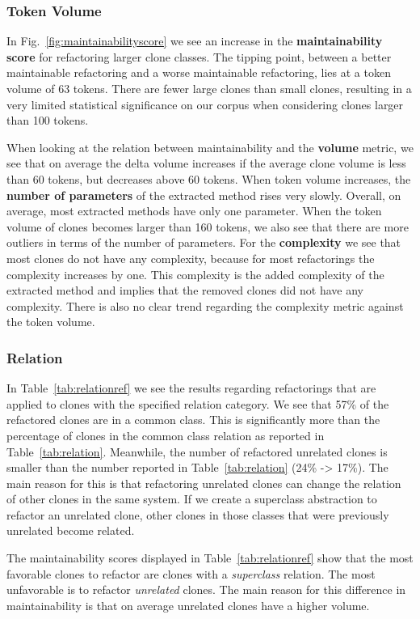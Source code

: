 \subsubsection{Token Volume}
In Fig.~\ref{fig:maintainabilityscore} we see an increase in the \textbf{maintainability score} for refactoring larger clone classes. The tipping point, between a better maintainable refactoring and a worse maintainable refactoring, lies at a token volume of 63 tokens. There are fewer large clones than small clones, resulting in a very limited statistical significance on our corpus when considering clones larger than 100 tokens.

When looking at the relation between maintainability and the \textbf{volume} metric, we see that on average the delta volume increases if the average clone volume is less than 60 tokens, but decreases above 60 tokens. When token volume increases, the \textbf{number of parameters} of the extracted method rises very slowly. Overall, on average, most extracted methods have only one parameter. When the token volume of clones becomes larger than 160 tokens, we also see that there are more outliers in terms of the number of parameters. For the \textbf{complexity} we see that most clones do not have any complexity, because for most refactorings the complexity increases by one. This complexity is the added complexity of the extracted method and implies that the removed clones did not have any complexity. There is also no clear trend regarding the complexity metric against the token volume.

\subsubsection{Relation}
In Table~\ref{tab:relationref} we see the results regarding refactorings that are applied to clones with the specified relation category. We see that 57\% of the refactored clones are in a common class. This is significantly more than the percentage of clones in the common class relation as reported in Table~\ref{tab:relation}. Meanwhile, the number of refactored unrelated clones is smaller than the number reported in Table~\ref{tab:relation} (24\% -> 17\%). The main reason for this is that refactoring unrelated clones can change the relation of other clones in the same system. If we create a superclass abstraction to refactor an unrelated clone, other clones in those classes that were previously unrelated become related.

The maintainability scores displayed in Table~\ref{tab:relationref} show that the most favorable clones to refactor are clones with a \textit{superclass} relation. The most unfavorable is to refactor \textit{unrelated} clones. The main reason for this difference in maintainability is that on average unrelated clones have a higher volume.

